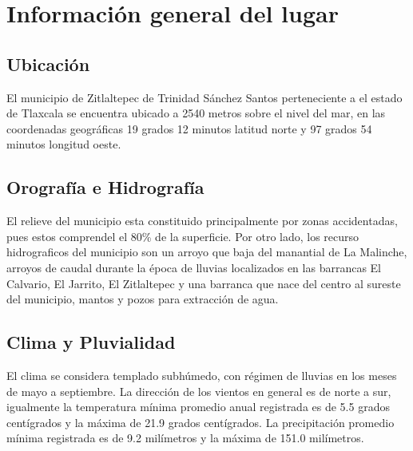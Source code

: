\documentclass[utf8]{FrontiersinHarvard} %
\begin{document}

\section{Información general del lugar}
\subsection{Ubicación}
El municipio de Zitlaltepec de Trinidad Sánchez Santos perteneciente a el estado de Tlaxcala se encuentra ubicado a 
2540 metros sobre el nivel del mar, en las coordenadas geográficas 19 grados 12 minutos latitud norte y 97 grados 54 minutos longitud oeste.
\subsection{Orografía e Hidrografía} 
El relieve del municipio esta constituido principalmente por zonas accidentadas, pues estos comprendel el 80\% de la superficie.
Por otro lado, los recurso hidrograficos del municipio son un arroyo que baja del manantial de La Malinche, arroyos de caudal durante la época de lluvias localizados en las barrancas El Calvario, El Jarrito, El Zitlaltepec y una barranca que nace del centro al sureste del municipio, mantos y pozos para extracción de agua. 
\subsection{Clima y Pluvialidad}
El clima se considera templado subhúmedo, con régimen de lluvias en los 
meses de mayo a septiembre.
La dirección de los vientos en general es de norte a sur, igualmente la temperatura 
mínima promedio anual registrada es de 5.5 grados centígrados y la máxima de 21.9 grados 
centígrados. La precipitación promedio mínima registrada es de 9.2 milímetros y la máxima de 151.0 milímetros.
\end{document}
